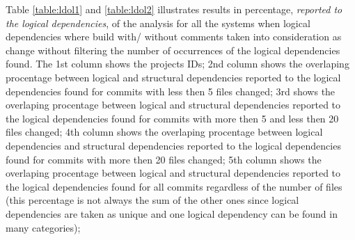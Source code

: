 Table \ref{table:ldol1} and \ref{table:ldol2} illustrates results in percentage, \textit{ reported to the logical dependencies}, of the analysis for all the systems when logical dependencies where build with/ without comments taken into consideration as change without filtering the number of occurrences of the logical dependencies found. The 1st column shows the projects IDs; 2nd column shows the overlaping procentage between logical and structural dependencies reported to the logical dependencies found for commits with less then 5 files changed; 3rd shows the overlaping procentage between logical and structural dependencies reported to the logical dependencies found for commits with more then 5 and less then 20 files changed; 4th column shows the overlaping procentage between logical dependencies and structural dependencies reported to the logical dependencies found for commits with more then 20 files changed; 5th column shows the overlaping procentage between logical and structural dependencies reported to the logical dependencies found for all commits regardless of the number of files (this percentage is not always the sum of the other ones since logical dependencies are taken as unique and one logical dependency can be found in many categories);\\


